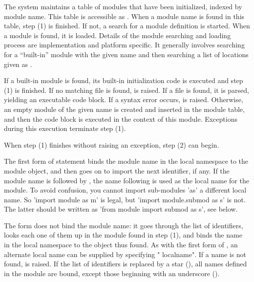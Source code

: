 The system maintains a table of modules that have been initialized,
indexed by module name.  This table is
accessible as .  When a module name is found in
this table, step (1) is finished.  If not, a search for a module
definition is started.  When a module is found, it is loaded.  Details
of the module searching and loading process are implementation and
platform specific.  It generally involves searching for a ``built-in''
module with the given name and then searching a list of locations
given as .

If a built-in module is found, its built-in initialization code is
executed and step (1) is finished.  If no matching file is found,
 is raised.  If a file is found, it is parsed,
yielding an executable code block.  If a syntax error occurs,
 is raised.  Otherwise, an empty module of the given
name is created and inserted in the module table, and then the code
block is executed in the context of this module.  Exceptions during
this execution terminate step (1).

When step (1) finishes without raising an exception, step (2) can
begin.

The first form of  statement binds the module name in the
local namespace to the module object, and then goes on to import the
next identifier, if any.  If the module name is followed by ,
the name following  is used as the local name for the module. To
avoid confusion, you cannot import sub-modules 'as' a different
local name. So 'import module as m' is legal, but 'import module.submod as
s' is not. The latter should be written as 'from module import submod as s',
see below.

The  form does not bind the module name: it goes through the
list of identifiers, looks each one of them up in the module found in step
(1), and binds the name in the local namespace to the object thus found. 
As with the first form of , an alternate local name can be
supplied by specifying " localname".  If a name is not found,
 is raised.  If the list of identifiers is replaced
by a star (\samp{*}), all names defined in the module are bound, except
those beginning with an underscore (\character{_}).

